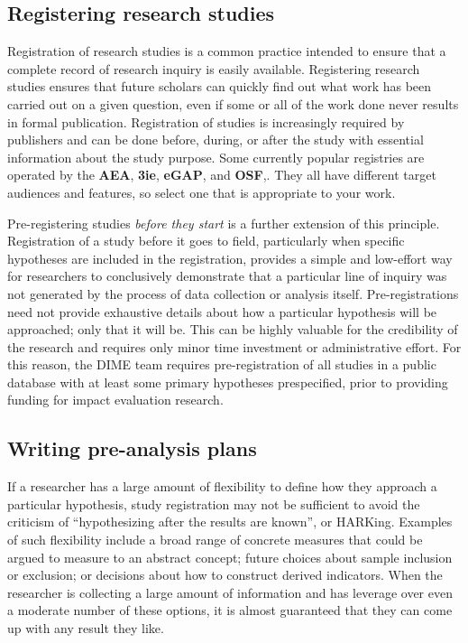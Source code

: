 \subsection{Registering research studies}

Registration of research studies is a common practice
intended to ensure that a complete record of research inquiry is easily available.
Registering research studies ensures that future scholars can quickly
find out what work has been carried out on a given question,
even if some or all of the work done never results in formal publication.
Registration of studies is increasingly required by publishers
and can be done before, during, or after the study
with essential information about the study purpose.
Some currently popular registries are operated by the
\textbf{AEA},
\textbf{3ie},
\textbf{eGAP},
and \textbf{OSF},.
They all have different target audiences and features,
so select one that is appropriate to your work.

Pre-registering studies \textit{before they start} is a further extension of this principle.\cite{nosek2018preregistration}
Registration of a study before it goes to field,
particularly when specific hypotheses are included in the registration,
provides a simple and low-effort way for researchers
to conclusively demonstrate that a particular line of inquiry
was not generated by the process of data collection or analysis itself.
Pre-registrations need not provide exhaustive details about how
a particular hypothesis will be approached; only that it will be.
This can be highly valuable for the credibility of the research
and requires only minor time investment or administrative effort.
For this reason, the DIME team requires pre-registration of all studies
in a public database with at least some primary hypotheses prespecified,
prior to providing funding for impact evaluation research.

\subsection{Writing pre-analysis plans}

If a researcher has a large amount of flexibility
to define how they approach a particular hypothesis,
study registration may not be sufficient to avoid the criticism of
``hypothesizing after the results are known'', or HARKing.\cite{kerr1998harking}
Examples of such flexibility include a broad range
of concrete measures that could be argued to measure to an abstract concept;
future choices about sample inclusion or exclusion;
or decisions about how to construct derived indicators.
When the researcher is collecting a large amount of information
and has leverage over even a moderate number of these options,
it is almost guaranteed that they can come up with any result they like.\cite{gelman2013garden}

